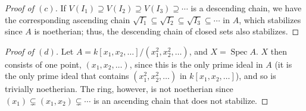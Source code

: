 \documentclass[10pt]{article}
\theoremstyle{definition}
\theoremstyle{remark}
\numberwithin{equation}{section}
\numberwithin{figure}{subsubsection}
\DeclareMathOperator{\Spec}{Spec}
\begin{document}
\begin{proof}[Proof of $(c)$]
  If $V(I_1) \supseteq V(I_2) \supseteq V(I_3) \supseteq \cdots$ is a descending chain, we have the corresponding ascending chain $\sqrt{I_1} \subseteq \sqrt{I_2} \subseteq \sqrt{I_3} \subseteq \cdots$ in $A$, which stabilizes since $A$ is noetherian; thus, the descending chain of closed sets also stabilizes.
\end{proof}
\begin{proof}[Proof of $(d)$]
  Let $A = k[x_1,x_2,\ldots]/(x_1^2,x_2^2,\ldots)$, and $X = \Spec A$. $X$ then consists of one point, $(x_1,x_2,\ldots)$, since this is the only prime ideal in $A$ (it is the only prime ideal that contains $(x_1^2,x_2^2,\ldots)$ in $k[x_1,x_2,\ldots]$), and so is trivially noetherian. The ring, however, is not noetherian since $(x_1) \subsetneq (x_1,x_2) \subsetneq \cdots$ is an ascending chain that does not stabilize.
\end{proof}
\end{document}
